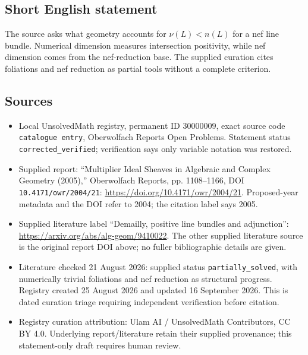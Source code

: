\documentclass[11pt]{article}
\begin{document}
\subsection{Short English statement}
The source asks what geometry accounts for \(\nu(L)<n(L)\) for a nef line bundle. Numerical dimension measures intersection positivity, while nef dimension comes from the nef-reduction base. The supplied curation cites foliations and nef reduction as partial tools without a complete criterion.
\subsection{Sources}
\begin{itemize}
\item Local UnsolvedMath registry, permanent ID \(30000009\), exact source code \texttt{catalogue entry}, Oberwolfach Reports Open Problems. Statement status \texttt{corrected\_verified}; verification says only variable notation was restored.
\item Supplied report: ``Multiplier Ideal Sheaves in Algebraic and Complex Geometry (2005),'' Oberwolfach Reports, pp. 1108--1166, DOI \texttt{10.4171/owr/2004/21}: \url{https://doi.org/10.4171/owr/2004/21}. Proposed-year metadata and the DOI refer to 2004; the citation label says 2005.
\item Supplied literature label ``Demailly, positive line bundles and adjunction'': \url{https://arxiv.org/abs/alg-geom/9410022}. The other supplied literature source is the original report DOI above; no fuller bibliographic details are given.
\item Literature checked 21 August 2026: supplied status \texttt{partially\_solved}, with numerically trivial foliations and nef reduction as structural progress. Registry created 25 August 2026 and updated 16 September 2026. This is dated curation triage requiring independent verification before citation.
\item Registry curation attribution: Ulam AI / UnsolvedMath Contributors, CC BY 4.0. Underlying report/literature retain their supplied provenance; this statement-only draft requires human review.
\end{itemize}
\end{document}
